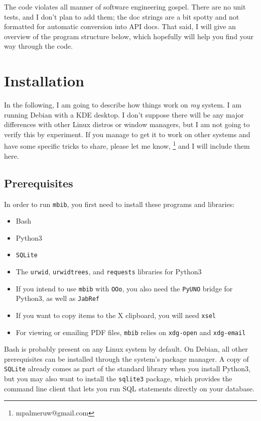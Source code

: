\documentclass[10pt]{article}
\newcommand*{\mbib}{\texttt{mbib}\xspace}
\newcommand*{\jabref}{\texttt{JabRef}\xspace}
\newcommand*{\ooo}{\texttt{OOo}\xspace}
\newcommand*{\sqlite}{\texttt{SQLite}\xspace}
\begin{document}
The code violates all manner of software engineering gospel. There are no unit tests, and I don't plan to add them; the doc strings are a bit spotty and not formatted for automatic conversion into API docs. That said, I will give an overview of the program structure below, which hopefully will help you find your way through the code. 

\section{Installation}

In the following, I am going to describe how things work on \emph{my} system. I am running Debian with a KDE desktop. I don't suppose there will be any major differences with other Linux distros or window managers, but I am not going to verify this by experiment. If you manage to get it to work on other systems and have some specific tricks to share, please let me know,%
%
\footnote{mpalmeruw@gmail.com}
%
and I will include them here.

\subsection{Prerequisites}

In order to run \mbib, you first need to install these programs and libraries:

\begin{itemize}
\item Bash
\item Python3 
\item \sqlite
\item The \texttt{urwid}, \texttt{urwidtrees}, and \texttt{requests} libraries for Python3
\item If you intend to use \mbib with \ooo, you also need the \texttt{PyUNO} bridge for Python3, as well as \jabref
\item If you want to copy items to the X clipboard, you will need \texttt{xsel}
\item For viewing or emailing PDF files, \mbib relies on \texttt{xdg-open} and \texttt{xdg-email}
\end{itemize}

\noindent Bash is probably present on any Linux system by default. On Debian, all other prerequisites can be installed through the system's package manager. A copy of \sqlite already comes as part of the standard library when you install Python3, but you may also want to install the \texttt{sqlite3} package, which provides the command line client that lets you run SQL statements directly on your database. 
\end{document}
